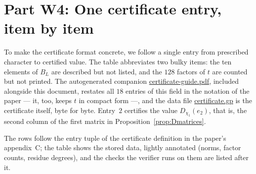 \documentclass[11pt]{article}
\providecommand{\nolinkurl}[1]{\url{#1}}
\begin{document}
\section*{Part W4: One certificate entry, item by item}

To make the certificate format concrete, we follow a single entry from
prescribed character to certified value.  The table abbreviates
two bulky items: the ten elements of $B_L$ are described but not
listed, and the $128$ factors of $t$ are counted but not printed.
The autogenerated companion \nolinkurl{certificate-guide.pdf},
included alongside this document, restates all $18$ entries of
this field in the notation of the paper --- it, too, keeps $t$ in
compact form ---, and the data file \nolinkurl{certificate.gp} is
the certificate itself, byte for byte.  Entry~$2$ certifies
the value $D_{\chi_1}(e_2)$, that is, the second column of the first matrix
in Proposition~\ref{prop:Dmatrices}.

The rows follow the entry tuple of the certificate definition in
the paper's appendix~C; the table shows the stored data, lightly
annotated (norms, factor counts, residue degrees), and the checks
the verifier runs on them are listed after it.
\end{document}

